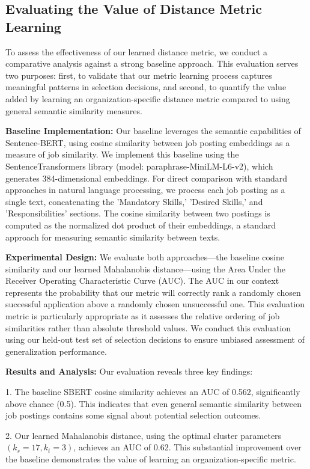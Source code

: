 \subsection{Evaluating the Value of Distance Metric Learning}

To assess the effectiveness of our learned distance metric, we conduct a comparative analysis against a strong baseline approach. 
This evaluation serves two purposes: first, to validate that our metric learning process captures meaningful patterns in selection decisions, 
and second, to quantify the value added by learning an organization-specific distance metric compared to using general semantic similarity measures.

\textbf{Baseline Implementation:} Our baseline leverages the semantic capabilities of Sentence-BERT, using cosine similarity between job 
posting embeddings as a measure of job similarity. We implement this baseline using the SentenceTransformers library (model: paraphrase-MiniLM-L6-v2), 
which generates 384-dimensional embeddings. For direct comparison with standard approaches in natural language processing, we process each job posting 
as a single text, concatenating the 'Mandatory Skills,' 'Desired Skills,' and 'Responsibilities' sections. The cosine similarity between two postings 
is computed as the normalized dot product of their embeddings, a standard approach for measuring semantic similarity between texts.

\textbf{Experimental Design:} We evaluate both approaches---the baseline cosine similarity and our learned Mahalanobis distance---using the 
Area Under the Receiver Operating Characteristic Curve (AUC). The AUC in our context represents the probability that our metric will correctly 
rank a randomly chosen successful application above a randomly chosen unsuccessful one. This evaluation metric is particularly appropriate as 
it assesses the relative ordering of job similarities rather than absolute threshold values. We conduct this evaluation using our held-out 
test set of selection decisions to ensure unbiased assessment of generalization performance.

\textbf{Results and Analysis:} Our evaluation reveals three key findings:

1. The baseline SBERT cosine similarity achieves an AUC of 0.562, significantly above chance (0.5). This indicates that even general semantic 
similarity between job postings contains some signal about potential selection outcomes.

2. Our learned Mahalanobis distance, using the optimal cluster parameters $(k_s = 17, k_t = 3)$, achieves an AUC of 0.62. This substantial 
improvement over the baseline demonstrates the value of learning an organization-specific metric.

